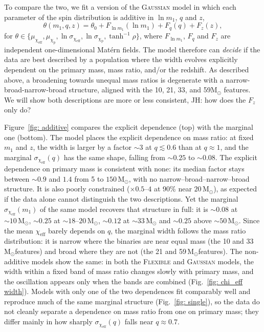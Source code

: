 \documentclass[%
 reprint,
 amsmath,amssymb,
 aps,
 prl,
 nofootinbib,nobibnotes,
]{revtex4-2}
\newcommand{\Msun}{\ensuremath{\mathrm{M}_{\odot}}}
\newcommand{\chieff}{\ensuremath{\chi_{\mathrm{eff}}}}
\newcommand{\chip}{\ensuremath{\chi_{\mathrm{p}}}}
\newcommand{\red}[1]{{\color{Red} #1}}
\newcommand{\jh}[1]{{\color{orange}JH: #1}}
\newcommand{\flexiblespins}{\textsc{Flexible}\xspace}
\newcommand{\gaussianspins}{\textsc{Gaussian}\xspace}
\newcommand{\featTen}{10\xspace}
\newcommand{\featTwenty}{21\xspace}
\newcommand{\featThirtyFive}{33\xspace}
\newcommand{\featSixty}{59\xspace}
\begin{document}
To compare the two, we fit a version of the \gaussianspins model in which each parameter of the spin distribution is additive in $\ln m_1$, $q$ and $z$,
\begin{equation}
    \theta(m_1, q, z) = \theta_0 + F_{\ln m_1}(\ln m_1) + F_q(q) + F_z(z),
    \label{eq: additive}
\end{equation}
for $\theta \in \{\mu_{\chieff}, \mu_{\chip}, \ln\sigma_{\chieff}, \ln\sigma_{\chip}, \tanh^{-1}\rho\}$, where $F_{\ln m_1}$, $F_q$ and $F_z$ are independent one-dimensional Mat\'ern fields. The model therefore can \textit{decide} if the data are best described by a population where the width evolves explicitly dependent on the primary mass, mass ratio, and/or the redshift. As described above, a broadening towards unequal mass ratios is degenerate with a narrow-broad-narrow-broad structure, aligned with the \featTen, \featTwenty, \featThirtyFive, and \featSixty $\Msun$ features. We will show both descriptions are more or less consistent, \jh{how does the $F_z$ only do?}

Figure~\ref{fig: additive} compares the explicit dependence (top) with the marginal one (bottom). The model places the explicit dependence on mass ratio: at fixed $m_1$ and $z$, the width is larger by a factor $\sim 3$ at $q \lesssim 0.6$ than at $q \approx 1$, and the marginal $\sigma_{\chieff}(q)$ has the same shape, falling from $\sim 0.25$ to $\sim 0.08$. The explicit dependence on primary mass is consistent with none: its median factor stays between $\sim 0.9$ and $1.4$ from 5 to $150\,\Msun$, with no narrow--broad--narrow--broad structure. It is also poorly constrained ($\times 0.5$--$4$ at 90\% near $20\,\Msun$), as expected if the data alone cannot distinguish the two descriptions. Yet the marginal $\sigma_{\chieff}(m_1)$ of the same model recovers that structure in full: it is $\sim 0.08$ at $\sim \featTen\,\Msun$, $\sim 0.25$ at $\sim 18$--$20\,\Msun$, $\sim 0.12$ at $\sim \featThirtyFive\,\Msun$ and $\sim 0.25$ above $\sim 50\,\Msun$. Since the mean $\chieff$ barely depends on $q$, the marginal width follows the mass ratio distribution: it is narrow where the binaries are near equal mass (the \featTen and \featThirtyFive\,\Msun features) and broad where they are not (the \featTwenty and \featSixty\,\Msun features). The non-additive models show the same: in both the \flexiblespins and \gaussianspins models, the width within a fixed band of mass ratio changes slowly with primary mass, and the oscillation appears only when the bands are combined (Fig.~\ref{fig: chi_eff width}). \red{Models with only one of the two dependences fit comparably well and reproduce much of the same marginal structure (Fig.~\ref{fig: single}), so the data do not cleanly separate a dependence on mass ratio from one on primary mass; they differ mainly in how sharply $\sigma_{\chieff}(q)$ falls near $q \approx 0.7$.}
\end{document}
